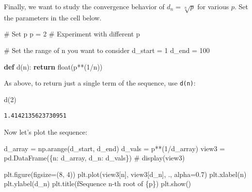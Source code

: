 \documentclass[
  letterpaper,
  DIV=11,
  numbers=noendperiod]{scrreprt}
\newenvironment{Shaded}{\begin{snugshade}}{\end{snugshade}}
\newcommand{\BuiltInTok}[1]{\textcolor[rgb]{0.00,0.23,0.31}{#1}}
\newcommand{\CommentTok}[1]{\textcolor[rgb]{0.37,0.37,0.37}{#1}}
\newcommand{\ControlFlowTok}[1]{\textcolor[rgb]{0.00,0.23,0.31}{\textbf{#1}}}
\newcommand{\DecValTok}[1]{\textcolor[rgb]{0.68,0.00,0.00}{#1}}
\newcommand{\FloatTok}[1]{\textcolor[rgb]{0.68,0.00,0.00}{#1}}
\newcommand{\KeywordTok}[1]{\textcolor[rgb]{0.00,0.23,0.31}{\textbf{#1}}}
\newcommand{\NormalTok}[1]{\textcolor[rgb]{0.00,0.23,0.31}{#1}}
\newcommand{\OperatorTok}[1]{\textcolor[rgb]{0.37,0.37,0.37}{#1}}
\newcommand{\SpecialCharTok}[1]{\textcolor[rgb]{0.37,0.37,0.37}{#1}}
\newcommand{\SpecialStringTok}[1]{\textcolor[rgb]{0.13,0.47,0.30}{#1}}
\newcommand{\StringTok}[1]{\textcolor[rgb]{0.13,0.47,0.30}{#1}}
\theoremstyle{plain}
\theoremstyle{plain}
\theoremstyle{definition}
\theoremstyle{definition}
\theoremstyle{definition}
\theoremstyle{plain}
\theoremstyle{plain}
\theoremstyle{remark}
\begin{document}
Finally, we want to study the convergence behavior of
\(d_n = \sqrt[n]{p}\) for various \(p\). Set the parameters in the cell
below.

\begin{Shaded}
\begin{Highlighting}[]
\CommentTok{\# Set p}
\NormalTok{p }\OperatorTok{=} \DecValTok{2}    \CommentTok{\# Experiment with different p}

\CommentTok{\# Set the range of n you want to consider}
\NormalTok{d\_start }\OperatorTok{=} \DecValTok{1}
\NormalTok{d\_end }\OperatorTok{=} \DecValTok{100}

\KeywordTok{def}\NormalTok{ d(n):}
    \ControlFlowTok{return} \BuiltInTok{float}\NormalTok{(p}\OperatorTok{**}\NormalTok{(}\DecValTok{1}\OperatorTok{/}\NormalTok{n))}
\end{Highlighting}
\end{Shaded}

As above, to return just a single term of the sequence, use
\texttt{d(n)}:

\begin{Shaded}
\begin{Highlighting}[]
\NormalTok{d(}\DecValTok{2}\NormalTok{)}
\end{Highlighting}
\end{Shaded}

\begin{verbatim}
1.4142135623730951
\end{verbatim}

Now let's plot the sequence:

\begin{Shaded}
\begin{Highlighting}[]
\NormalTok{d\_array }\OperatorTok{=}\NormalTok{ np.arange(d\_start, d\_end)}
\NormalTok{d\_vals }\OperatorTok{=}\NormalTok{ p}\OperatorTok{**}\NormalTok{(}\DecValTok{1}\OperatorTok{/}\NormalTok{d\_array)}
\NormalTok{view3 }\OperatorTok{=}\NormalTok{ pd.DataFrame(\{}\StringTok{\textquotesingle{}n\textquotesingle{}}\NormalTok{: d\_array, }\StringTok{\textquotesingle{}d\_n\textquotesingle{}}\NormalTok{: d\_vals\})}
\CommentTok{\# display(view3)}

\NormalTok{plt.figure(figsize}\OperatorTok{=}\NormalTok{(}\DecValTok{8}\NormalTok{, }\DecValTok{4}\NormalTok{))}
\NormalTok{plt.plot(view3[}\StringTok{\textquotesingle{}n\textquotesingle{}}\NormalTok{], view3[}\StringTok{\textquotesingle{}d\_n\textquotesingle{}}\NormalTok{], }\StringTok{\textquotesingle{}.\textquotesingle{}}\NormalTok{, alpha}\OperatorTok{=}\FloatTok{0.7}\NormalTok{)}
\NormalTok{plt.xlabel(}\StringTok{\textquotesingle{}n\textquotesingle{}}\NormalTok{)}
\NormalTok{plt.ylabel(}\StringTok{\textquotesingle{}d\_n\textquotesingle{}}\NormalTok{)}
\NormalTok{plt.title(}\SpecialStringTok{f\textquotesingle{}Sequence n{-}th root of }\SpecialCharTok{\{}\NormalTok{p}\SpecialCharTok{\}}\SpecialStringTok{\textquotesingle{}}\NormalTok{)}
\NormalTok{plt.show()}
\end{Highlighting}
\end{Shaded}
\end{document}
